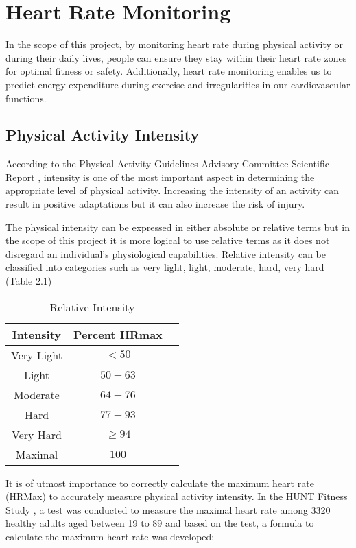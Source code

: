 \section{Heart Rate Monitoring}
In the scope of this project, by monitoring heart rate during physical activity or during their daily lives, people can ensure they stay within their heart rate zones for optimal fitness or safety.
Additionally, heart rate monitoring enables us to predict energy expenditure during exercise and irregularities in our cardiovascular functions.

\subsection{Physical Activity Intensity}
According to the Physical Activity Guidelines Advisory Committee Scientific Report \autocite{healthgov2008}, intensity is one of the most important aspect in determining the appropriate level of physical activity.
Increasing the intensity of an activity can result in positive adaptations but it can also increase the risk of injury. 

The physical intensity can be expressed in either absolute or relative terms but in the scope of this project it is more logical to use relative terms as it does not disregard an individual's physiological capabilities. 
Relative intensity can be classified into categories such as very light, light, moderate, hard, very hard (Table 2.1) \autocite{healthgov2008}

\begin{table}[htbp]
    \centering
    \label{tab:intensity}
    \begin{tabular}{|c|c|c|}
      \hline
      \textbf{Intensity} & \textbf{Percent HRmax} \\
      \hline
      Very Light & $<50$ \\
      Light & $50-63$ \\
      Moderate & $64-76$ \\
      Hard & $77-93$ \\
      Very Hard & $\geq94$ \\
      Maximal & $100$ \\
      \hline
    \end{tabular}
    \caption{Relative Intensity \autocite{healthgov2008}}
  \end{table}
  
It is of utmost importance to correctly calculate the maximum heart rate (HRMax) to accurately measure physical activity intensity. In the HUNT Fitness Study \autocite{nes2013maximal}, a test was conducted to measure the maximal heart rate among 3320 healthy adults aged between 19 to 89 and based on the test, a formula to calculate the maximum heart rate was developed: 

